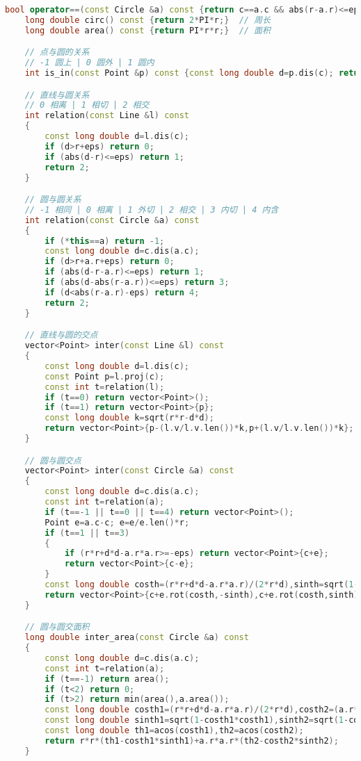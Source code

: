 \documentclass[a4paper]{book}
\begin{document}
\begin{lstlisting}[language=c++]
    bool operator==(const Circle &a) const {return c==a.c && abs(r-a.r)<=eps;}
    long double circ() const {return 2*PI*r;}  // 周长
    long double area() const {return PI*r*r;}  // 面积

    // 点与圆的关系
    // -1 圆上 | 0 圆外 | 1 圆内
    int is_in(const Point &p) const {const long double d=p.dis(c); return abs(d-r)<=eps?-1:d<r-eps;}

    // 直线与圆关系
    // 0 相离 | 1 相切 | 2 相交
    int relation(const Line &l) const
    {
        const long double d=l.dis(c);
        if (d>r+eps) return 0;
        if (abs(d-r)<=eps) return 1;
        return 2;
    }

    // 圆与圆关系
    // -1 相同 | 0 相离 | 1 外切 | 2 相交 | 3 内切 | 4 内含
    int relation(const Circle &a) const
    {
        if (*this==a) return -1;
        const long double d=c.dis(a.c);
        if (d>r+a.r+eps) return 0;
        if (abs(d-r-a.r)<=eps) return 1;
        if (abs(d-abs(r-a.r))<=eps) return 3;
        if (d<abs(r-a.r)-eps) return 4;
        return 2;
    }

    // 直线与圆的交点
    vector<Point> inter(const Line &l) const
    {
        const long double d=l.dis(c);
        const Point p=l.proj(c);
        const int t=relation(l);
        if (t==0) return vector<Point>();
        if (t==1) return vector<Point>{p};
        const long double k=sqrt(r*r-d*d);
        return vector<Point>{p-(l.v/l.v.len())*k,p+(l.v/l.v.len())*k};
    }

    // 圆与圆交点
    vector<Point> inter(const Circle &a) const
    {
        const long double d=c.dis(a.c);
        const int t=relation(a);
        if (t==-1 || t==0 || t==4) return vector<Point>();
        Point e=a.c-c; e=e/e.len()*r;
        if (t==1 || t==3) 
        {
            if (r*r+d*d-a.r*a.r>=-eps) return vector<Point>{c+e};
            return vector<Point>{c-e};
        }
        const long double costh=(r*r+d*d-a.r*a.r)/(2*r*d),sinth=sqrt(1-costh*costh);
        return vector<Point>{c+e.rot(costh,-sinth),c+e.rot(costh,sinth)};
    }

    // 圆与圆交面积
    long double inter_area(const Circle &a) const
    {
        const long double d=c.dis(a.c);
        const int t=relation(a);
        if (t==-1) return area();
        if (t<2) return 0;
        if (t>2) return min(area(),a.area());
        const long double costh1=(r*r+d*d-a.r*a.r)/(2*r*d),costh2=(a.r*a.r+d*d-r*r)/(2*a.r*d);
        const long double sinth1=sqrt(1-costh1*costh1),sinth2=sqrt(1-costh2*costh2);
        const long double th1=acos(costh1),th2=acos(costh2);
        return r*r*(th1-costh1*sinth1)+a.r*a.r*(th2-costh2*sinth2);
    }


\end{lstlisting}
\end{document}
